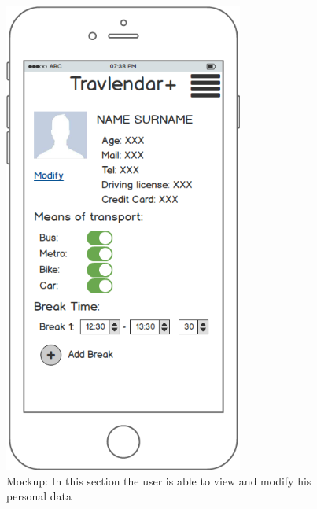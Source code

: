 \documentclass[numbers=noenddot, 12pt, a4paper, oneside]{scrbook}
\begin{document}
\begin{figure}[H]
	\centering
	\includegraphics[width=0.7\textwidth]{mockups/PersonalArea}
	\caption{Mockup: In this section the user is able to view and modify his personal data}
\end{figure}
\end{document}
